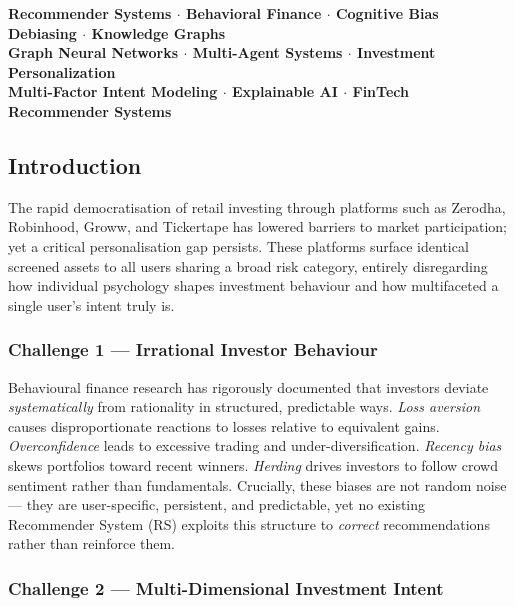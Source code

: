 \documentclass[12pt, a4paper]{article}
\begin{document}
\begin{center}
\textbf{
Recommender Systems \quad $\cdot$ \quad Behavioral Finance \quad $\cdot$ \quad
Cognitive Bias Debiasing \quad $\cdot$ \quad Knowledge Graphs \\[6pt]
Graph Neural Networks \quad $\cdot$ \quad Multi-Agent Systems \quad $\cdot$ \quad
Investment Personalization \\[6pt]
Multi-Factor Intent Modeling \quad $\cdot$ \quad Explainable AI \quad $\cdot$ \quad
FinTech Recommender Systems
}
\end{center}

\subsection{Introduction}

The rapid democratisation of retail investing through platforms such as Zerodha, Robinhood,
Groww, and Tickertape has lowered barriers to market participation; yet a critical
personalisation gap persists. These platforms surface identical screened assets to all
users sharing a broad risk category, entirely disregarding how individual psychology shapes
investment behaviour and how multifaceted a single user's intent truly is.

\subsubsection*{Challenge 1 --- Irrational Investor Behaviour}

Behavioural finance research has rigorously documented that investors deviate
\textit{systematically} from rationality in structured, predictable ways. \textit{Loss aversion}
causes disproportionate reactions to losses relative to equivalent gains. \textit{Overconfidence}
leads to excessive trading and under-diversification. \textit{Recency bias} skews portfolios
toward recent winners. \textit{Herding} drives investors to follow crowd sentiment rather than
fundamentals. Crucially, these biases are not random noise --- they are user-specific, persistent,
and predictable, yet no existing Recommender System (RS) exploits this structure to \textit{correct}
recommendations rather than reinforce them.

\subsubsection*{Challenge 2 --- Multi-Dimensional Investment Intent}
\end{document}
